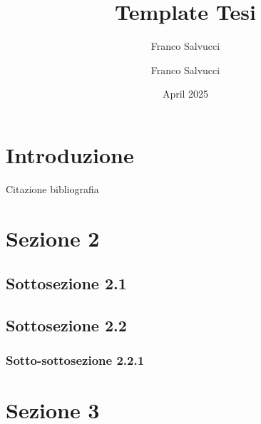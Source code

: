 \documentclass[a4paper,12pt]{article}
\author{Franco Salvucci}
\title{Template Tesi}
\author{Franco Salvucci }
\date{April 2025}
\begin{document}
\intestazione

\tableofcontents
\pagebreak
\section{Introduzione} 
Citazione bibliografia \cite{Template-Tesi}
\pagebreak
\section{Sezione 2}
\subsection{Sottosezione 2.1}
\subsection{Sottosezione 2.2}
\subsubsection{Sotto-sottosezione 2.2.1}
\section{Sezione 3}



\end{document}

